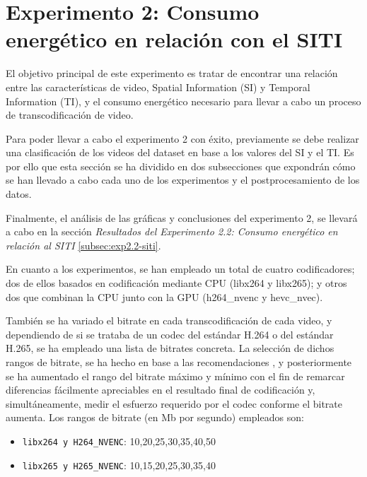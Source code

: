 \section{Experimento 2: Consumo energético en relación con el SITI}       
 El objetivo principal de este experimento es tratar de encontrar una relación entre las características de video, Spatial Information (SI) y Temporal Information (TI), y el consumo energético necesario para llevar a cabo un proceso de transcodificación de video. 

 Para poder llevar a cabo el experimento 2 con éxito, previamente se debe realizar una clasificación de los videos del dataset en base a los valores del SI y el TI. Es por ello que esta sección se ha dividido en dos subsecciones que expondrán cómo se han llevado a cabo cada uno de los experimentos y el postprocesamiento de los datos.

 Finalmente, el análisis de las gráficas y conclusiones del experimento 2, se llevará a cabo en la sección \textit{Resultados del Experimento 2.2: Consumo energético en relación al SITI} \ref{subsec:exp2.2-siti}. 

 En cuanto a los experimentos, se han empleado un total de cuatro codificadores; dos de ellos basados en codificación mediante CPU (libx264 y libx265); y otros dos que combinan la CPU junto con la GPU (h264\_nvenc y hevc\_nvec). 

 También se ha variado el bitrate en cada transcodificación de cada video, y dependiendo de si se trataba de un codec del estándar H.264 o del estándar H.265, se ha empleado una lista de bitrates concreta. La selección de dichos rangos de bitrate, se ha hecho en base a las recomendaciones \cite{bitrate-encoder-selection}, y posteriormente se ha aumentado el rango del bitrate máximo y mínimo con el fin de remarcar diferencias fácilmente apreciables en el resultado final de codificación y, simultáneamente, medir el esfuerzo requerido por el codec conforme el bitrate aumenta. Los rangos de bitrate (en Mb por segundo) empleados son:

\begin{itemize} 

 \item \texttt{libx264 y H264\_NVENC}: 10,20,25,30,35,40,50

 \item \texttt{libx265 y H265\_NVENC}: 10,15,20,25,30,35,40   

 \end{itemize}

